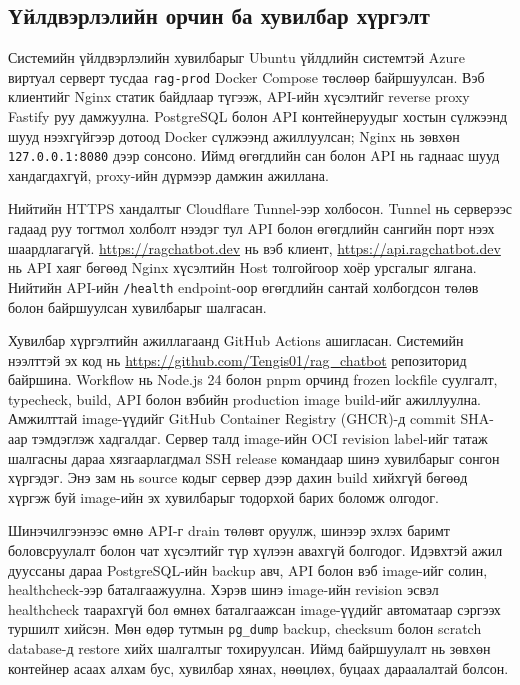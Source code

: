 \documentclass[../main.tex]{subfiles}
\begin{document}
\subsection{Үйлдвэрлэлийн орчин ба хувилбар хүргэлт}

Системийн үйлдвэрлэлийн хувилбарыг Ubuntu үйлдлийн системтэй Azure виртуал
серверт тусдаа \texttt{rag-prod} Docker Compose төслөөр байршуулсан. Вэб
клиентийг Nginx статик байдлаар түгээж, API-ийн хүсэлтийг reverse proxy
Fastify руу дамжуулна. PostgreSQL болон API контейнеруудыг хостын сүлжээнд
шууд нээхгүйгээр дотоод Docker сүлжээнд ажиллуулсан; Nginx нь зөвхөн
\texttt{127.0.0.1:8080} дээр сонсоно. Иймд өгөгдлийн сан болон API нь гаднаас
шууд хандагдахгүй, proxy-ийн дүрмээр дамжин ажиллана.

Нийтийн HTTPS хандалтыг Cloudflare Tunnel-ээр холбосон. Tunnel нь серверээс
гадаад руу тогтмол холболт нээдэг тул API болон өгөгдлийн сангийн порт нээх
шаардлагагүй. \url{https://ragchatbot.dev} нь вэб клиент, \url{https://api.ragchatbot.dev}
нь API хаяг бөгөөд Nginx хүсэлтийн Host толгойгоор хоёр урсгалыг ялгана.
Нийтийн API-ийн \texttt{/health} endpoint-оор өгөгдлийн сантай холбогдсон
төлөв болон байршуулсан хувилбарыг шалгасан.

Хувилбар хүргэлтийн ажиллагаанд GitHub Actions ашигласан. Системийн нээлттэй эх
код нь \url{https://github.com/Tengis01/rag_chatbot} репозиторид байршина.
Workflow нь Node.js 24 болон pnpm орчинд frozen lockfile суулгалт, typecheck,
build, API болон вэбийн production image build-ийг ажиллуулна. Амжилттай
image-үүдийг GitHub
Container Registry (GHCR)-д commit SHA-аар тэмдэглэж хадгалдаг. Сервер талд
image-ийн OCI revision label-ийг татаж шалгасны дараа хязгаарлагдмал SSH
release командаар шинэ хувилбарыг сонгон хүргэдэг. Энэ зам нь source кодыг
сервер дээр дахин build хийхгүй бөгөөд хүргэж буй image-ийн эх хувилбарыг
тодорхой барих боломж олгодог.

Шинэчилгээнээс өмнө API-г drain төлөвт оруулж, шинээр эхлэх баримт
боловсруулалт болон чат хүсэлтийг түр хүлээн авахгүй болгодог. Идэвхтэй ажил
дууссаны дараа PostgreSQL-ийн backup авч, API болон вэб image-ийг солин,
healthcheck-ээр баталгаажуулна. Хэрэв шинэ image-ийн revision эсвэл healthcheck
таарахгүй бол өмнөх баталгаажсан image-үүдийг автоматаар сэргээх туршилт хийсэн.
Мөн өдөр тутмын \texttt{pg\_dump} backup, checksum болон scratch database-д
restore хийх шалгалтыг тохируулсан. Иймд байршуулалт нь зөвхөн контейнер асаах
алхам бус, хувилбар хянах, нөөцлөх, буцаах дараалалтай болсон.
\end{document}
